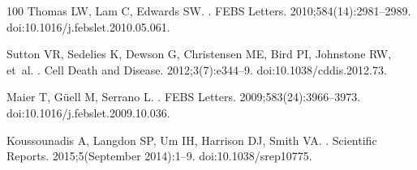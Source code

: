 \documentclass[10pt,letterpaper]{article}
\begin{document}
\begin{thebibliography}{100}
Thomas LW, Lam C, Edwards SW.
.
\newblock FEBS Letters. 2010;584(14):2981--2989.
\newblock doi:{10.1016/j.febslet.2010.05.061}.

Sutton VR, Sedelies K, Dewson G, Christensen ME, Bird PI, Johnstone RW, et~al.
.
\newblock Cell Death and Disease. 2012;3(7):e344--9.
\newblock doi:{10.1038/cddis.2012.73}.

Maier T, G{\"{u}}ell M, Serrano L.
.
\newblock FEBS Letters. 2009;583(24):3966--3973.
\newblock doi:{10.1016/j.febslet.2009.10.036}.

Koussounadis A, Langdon SP, Um IH, Harrison DJ, Smith VA.
.
\newblock Scientific Reports. 2015;5(September 2014):1--9.
\newblock doi:{10.1038/srep10775}.

\end{thebibliography}
\end{document}
